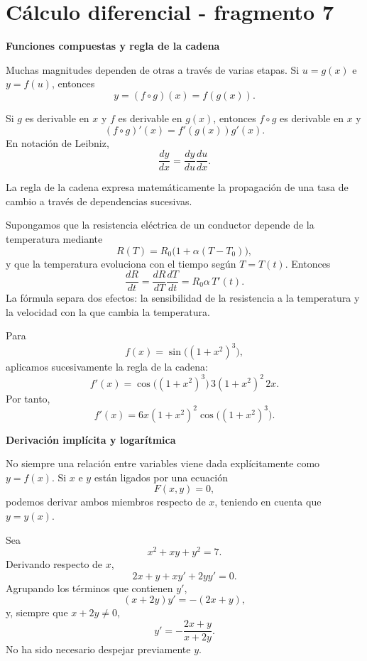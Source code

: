 \section{Cálculo diferencial - fragmento 7}
\textbf{Funciones compuestas y regla de la cadena}

Muchas magnitudes dependen de otras a través de varias etapas. Si $u=g(x)$ e $y=f(u)$, entonces
\[
y=(f\circ g)(x)=f(g(x)).
\]

\begin{theorem}
Si $g$ es derivable en $x$ y $f$ es derivable en $g(x)$, entonces $f\circ g$ es derivable en $x$ y
\[
(f\circ g)'(x)=f'(g(x))g'(x).
\]
En notación de Leibniz,
\[
\frac{dy}{dx}=\frac{dy}{du}\frac{du}{dx}.
\]
\end{theorem}

La regla de la cadena expresa matemáticamente la propagación de una tasa de cambio a través de dependencias sucesivas.

\begin{example}
Supongamos que la resistencia eléctrica de un conductor depende de la temperatura mediante
\[
R(T)=R_0\bigl(1+\alpha(T-T_0)\bigr),
\]
y que la temperatura evoluciona con el tiempo según $T=T(t)$. Entonces
\[
\frac{dR}{dt}
=
\frac{dR}{dT}\frac{dT}{dt}
=
R_0\alpha\,T'(t).
\]
La fórmula separa dos efectos: la sensibilidad de la resistencia a la temperatura y la velocidad con la que cambia la temperatura.
\end{example}

\begin{example}
Para
\[
f(x)=\sin\!\bigl((1+x^2)^3\bigr),
\]
aplicamos sucesivamente la regla de la cadena:
\[
f'(x)
=
\cos\!\bigl((1+x^2)^3\bigr)\,3(1+x^2)^2\,2x.
\]
Por tanto,
\[
\boxed{
f'(x)=6x(1+x^2)^2\cos\!\bigl((1+x^2)^3\bigr)
}.
\]
\end{example}

\textbf{Derivación implícita y logarítmica}

No siempre una relación entre variables viene dada explícitamente como $y=f(x)$. Si $x$ e $y$ están ligados por una ecuación
\[
F(x,y)=0,
\]
podemos derivar ambos miembros respecto de $x$, teniendo en cuenta que $y=y(x)$.

\begin{example}
Sea
\[
x^2+xy+y^2=7.
\]
Derivando respecto de $x$,
\[
2x+y+xy'+2yy'=0.
\]
Agrupando los términos que contienen $y'$,
\[
(x+2y)y'=-(2x+y),
\]
y, siempre que $x+2y\neq0$,
\[
\boxed{
y'=-\frac{2x+y}{x+2y}
}.
\]
No ha sido necesario despejar previamente $y$.
\end{example}


